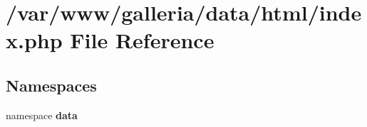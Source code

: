 \section{/var/www/galleria/data/html/index.php File Reference}
\label{index_8php}
\subsection*{Namespaces}
\begin{CompactItemize}
\item 
namespace {\bf data}
\end{CompactItemize}
